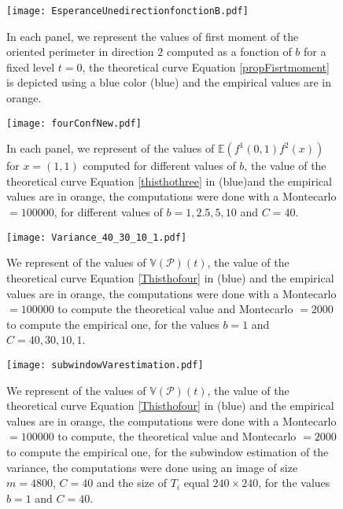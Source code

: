 \documentclass[12pt]{article}
\theoremstyle{Theorem}
\theoremstyle{definition}
\begin{document}
\begin{figure}[H]
  \centering
    {\texttt{[image: EsperanceUnedirectionfonctionB.pdf]}}
    \hspace{0.2cm}
 \caption{In each panel, we represent the values of first moment of the oriented perimeter in direction $2$ computed as a fonction of $b$ for a fixed level $t = 0$, the theoretical curve Equation \eqref{propFisrtmoment} is depicted using a blue color (blue) and the empirical values are in orange.}
\label{figsubwindow}
\end{figure}

\begin{figure}[H]
  \centering
    {\texttt{[image: fourConfNew.pdf]}}
    \hspace{0.2cm}
 \caption{In each panel, we represent of the values of $\mathbb{E}\left(f^{1}(0,1)f^{2}(x)\right)$ for $x = (1, 1)$ computed for different values of $b$, the value of the theoretical curve Equation \eqref{thisthothree} in (blue)and the empirical values are in orange, the computations were done with a Montecarlo $= 100000$, for different values of $b = 1, 2.5, 5, 10$ and $C = 40$. }
\label{figfourConNew}
\end{figure}

\begin{figure}[H]
  \centering
    {\texttt{[image: Variance\_40\_30\_10\_1.pdf]}}
    \hspace{0.2cm}
 \caption{We represent of the values of $\mathbb{V}\left(\mathcal{P}\right)(t)$, the value of the theoretical curve Equation \eqref{Thisthofour} in (blue) and the empirical values are in orange, the computations were done with a Montecarlo $= 100000$ to compute the theoretical value and Montecarlo $= 2000$ to compute the empirical one, for the values $b = 1$ and $C = 40, 30, 10,1$. }
\label{figVariance}
\end{figure}
\begin{figure}[H]
  \centering
    {\texttt{[image: subwindowVarestimation.pdf]}}
    \hspace{0.2cm}
 \caption{We represent of the values of $\mathbb{V}\left(\mathcal{P}\right)(t)$, the value of the theoretical curve Equation \eqref{Thisthofour} in (blue) and the empirical values are in orange, the computations were done with a Montecarlo $= 100000$ to compute, the theoretical value and Montecarlo $= 2000$ to compute the empirical one, for the subwindow estimation of the variance, the computations were done using an image of size $ m = 4800$, $C = 40$ and the size of $T_{i}$ equal $240\times240$, for the values $b = 1$ and $C = 40$. }
\label{figSubwindowVariance}
\end{figure}
\end{document}
